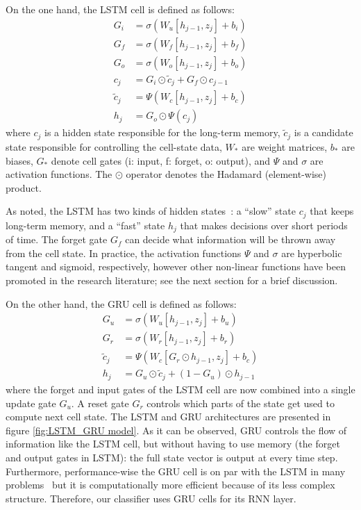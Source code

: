 \documentclass[sn-mathphys, pdflatex]{sn-jnl}
\newcommand{\rev}[1]{#1}
\begin{document}
On the one hand, the LSTM cell is defined as follows:
%
\begin{align}
        G_i &= \sigma(W_u [ h_{j-1}, z_j ] + b_i) \\
        G_f &= \sigma(W_f [ h_{j-1}, z_j ] + b_f) \\
        G_o &= \sigma(W_o [ h_{j-1}, z_j ] + b_o) \\
        c_j &= \rev{G_i} \odot \tilde{c}_j + G_f \odot c_{j-1} \\
\tilde{c}_j &= \Psi(W_c [ h_{j-1}, z_j ] + b_c) \\
        h_j &= G_o \odot \Psi(c_j)
\end{align}
%
where
$c_j$ is a hidden state responsible for the long-term memory,
\rev{$\tilde{c}_j$ is a candidate state responsible for controlling the cell-state data,}
$W_*$ are weight matrices,
$b_*$ are biases,
$G_*$ denote cell gates (i: input, f: forget, o: output),
and $\Psi$ and $\sigma$ are activation functions. %
The $\odot$ operator denotes the Hadamard (element-wise) product.

As noted, the LSTM has two kinds of hidden states~\cite{Jozefowicz15}:
a ``slow'' state $c_j$ that keeps long-term memory, %
and a ``fast'' state $h_j$ that makes decisions over short periods of time.
The forget gate $G_f$ can decide what information will be thrown away from the cell state.
In practice, the activation functions $\Psi$ and $\sigma$ are hyperbolic tangent and sigmoid, respectively,
however other non-linear functions have been promoted in the research literature;
see the next section for a brief discussion.

On the other hand, the GRU cell is defined as follows:
\begin{align}
        G_u &= \sigma(W_u [ h_{j-1}, z_j ] + b_u) \\
        G_r &= \sigma(W_r [ h_{j-1}, z_j ] + b_r) \\
\tilde{c}_j &= \Psi(W_c [G_r \odot h_{j-1}, z_j ] + b_c) \\
        h_j &= G_u \odot \tilde{c}_j + (1 - G_u) \odot h_{j-1}
\end{align}
where the forget and input gates of the LSTM cell are now combined into a single update gate $G_u$.
A reset gate $G_r$ controls which parts of the state get used to compute next cell state.
The LSTM and GRU architectures are presented in figure \autoref{fig:LSTM_GRU model}.
As it can be observed, GRU controls the flow of information like the LSTM cell,
but without having to use memory (the forget and output gates in LSTM):
the full state vector is output at every time step.
Furthermore, performance-wise the GRU cell is on par with the LSTM in many problems~\cite{Chung14,Dey17}
but it is computationally more efficient because of its less complex structure.
Therefore, our classifier uses GRU cells for its RNN layer. %
\end{document}
